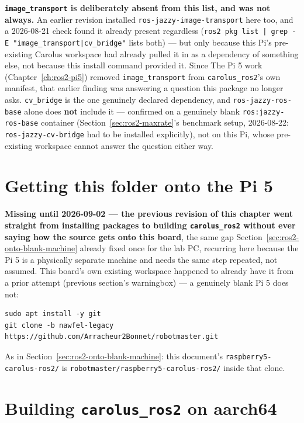 \documentclass[11pt]{report}
\begin{document}
\textbf{\texttt{image\_transport} is deliberately absent from this list, and
was not always.} An earlier revision installed
\texttt{ros-jazzy-image-transport} here too, and a 2026-08-21 check found it
already present regardless (\texttt{ros2 pkg list | grep -E
"image\_transport|cv\_bridge"} lists both) --- but only because this Pi's
pre-existing Carolus workspace had already pulled it in as a dependency of
something else, not because this install command provided it. Since
The Pi 5 work (Chapter~\ref{ch:ros2-pi5}) removed \texttt{image\_transport} from
\texttt{carolus\_ros2}'s own manifest, that earlier finding was answering a
question this package no longer asks. \texttt{cv\_bridge} is the one
genuinely declared dependency, and \texttt{ros-jazzy-ros-base} alone does
\textbf{not} include it --- confirmed on a genuinely blank
\texttt{ros:jazzy-ros-base} container (Section~\ref{sec:ros2-maxrate}'s
benchmark setup, 2026-08-22: \texttt{ros-jazzy-cv-bridge} had to be
installed explicitly), not on this Pi, whose pre-existing workspace cannot
answer the question either way.


\section{Getting this folder onto the Pi 5}

\textbf{Missing until 2026-09-02 --- the previous revision of this chapter
went straight from installing packages to building \texttt{carolus\_ros2}
without ever saying how the source gets onto this board}, the same gap
Section~\ref{sec:ros2-onto-blank-machine} already fixed once for the lab PC,
recurring here because the Pi 5 is a physically separate machine and needs
the same step repeated, not assumed. This board's own existing workspace
happened to already have it from a prior attempt (previous section's
warningbox) --- a genuinely blank Pi 5 does not:

\begin{lstlisting}[style=shell]
sudo apt install -y git
git clone -b nawfel-legacy https://github.com/Arracheur2Bonnet/robotmaster.git
\end{lstlisting}

As in Section~\ref{sec:ros2-onto-blank-machine}: this document's
\texttt{raspberry5-carolus-ros2/} is
\texttt{robotmaster/raspberry5-carolus-ros2/} inside that clone.

\section{Building \texttt{carolus\_ros2} on aarch64}
\end{document}
